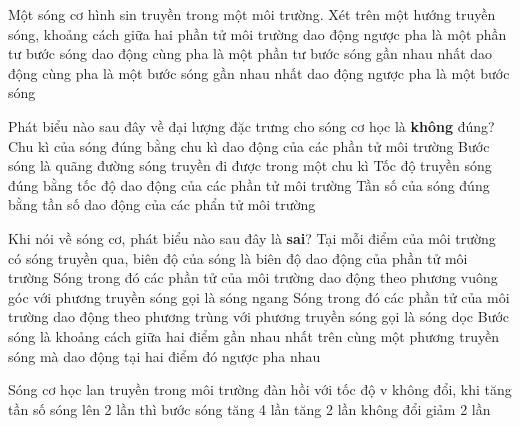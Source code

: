\begin{ex}%
Một sóng cơ hình sin truyền trong một môi trường. Xét trên một hướng truyền sóng, khoảng cách giữa hai phần tử môi trường
\choice
{dao động ngược pha là một phần tư bước sóng}
{dao động cùng pha là một phần tư bước sóng}
{\True gần nhau nhất dao động cùng pha là một bước sóng}
{gần nhau nhất dao động ngược pha là một bước sóng}
\end{ex} 
\begin{ex}%
Phát biểu nào sau đây về đại lượng đặc trưng cho sóng cơ học là \textbf{không} đúng?
\choice
{Chu kì của sóng đúng bằng chu kì dao động của các phần tử môi trường}
{Bước sóng là quãng đường sóng truyền đi được trong một chu kì}
{\True Tốc độ truyền sóng đúng bằng tốc độ dao động của các phần tử môi trường}
{Tần số của sóng đúng bằng tần số dao động của các phẩn tử môi trường}
\end{ex} 
\begin{ex}%
Khi nói về sóng cơ, phát biểu nào sau đây là \textbf{sai}?
\choice
{Tại mỗi điểm của môi trường có sóng truyền qua, biên độ của sóng là biên độ dao động của phần tử môi trường}
{Sóng trong đó các phần tử của môi trường dao động theo phương vuông góc với phương truyền sóng gọi là sóng ngang}
{Sóng trong đó các phần tử của môi trường dao động theo phương trùng với phương truyền sóng gọi là sóng dọc}
{\True Bước sóng là khoảng cách giữa hai điểm gần nhau nhất trên cùng một phương truyền sóng mà dao động tại hai điểm đó ngược pha nhau}
\end{ex} 
\begin{ex}%
Sóng cơ học lan truyền trong môi trường đàn hồi với tốc độ v không đổi, khi tăng tần số sóng lên 2 lần thì bước sóng
\choice
{tăng 4 lần}
{tăng 2 lần}
{không đổi}
{\True giảm 2 lần}
\end{ex} 
